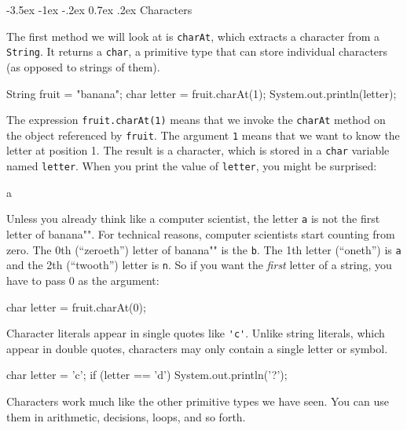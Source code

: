 \documentclass[12pt]{book}
\makeatletter
\theoremstyle{exercise}
\newcommand{\java}[1]{\verb"#1"}
\renewcommand{\section}{\@startsection {section}{1}{\z@}%
    {-3.5ex \@plus -1ex \@minus -.2ex}%
    {0.7ex \@plus.2ex}%
    {\normalfont\Large\bfseries}}
\newcommand{\java}[1]{\lstinline{#1}} %
\makeatother
\begin{document}
\section{Characters}


The first method we will look at is \java{charAt}, which extracts a character from a \java{String}.
It returns a \java{char}, a primitive type that can store individual characters (as opposed to strings of them).

\begin{code}
    String fruit = "banana";
    char letter = fruit.charAt(1);
    System.out.println(letter);
\end{code}

The expression \java{fruit.charAt(1)} means that we invoke the \java{charAt} method on the object referenced by \java{fruit}.
The argument \java{1} means that we want to know the letter at position 1.
The result is a character, which is stored in a \java{char} variable named \java{letter}.
When you print the value of \java{letter}, you might be surprised:

\begin{stdout}
a
\end{stdout}

Unless you already think like a computer scientist, the letter \java{a} is not the first letter of \java{"banana"}.
For technical reasons, computer scientists start counting from zero.
The 0th (``zeroeth'') letter of \java{"banana"} is the \java{b}.
The 1th letter (``oneth'') is \java{a} and the 2th (``twooth'') letter is \java{n}.
So if you want the {\em first} letter of a string, you have to pass 0 as the argument:

\begin{code}
    char letter = fruit.charAt(0);
\end{code}


Character literals appear in single quotes like \java{'c'}.
Unlike string literals, which appear in double quotes, characters may only contain a single letter or symbol.

\begin{code}
    char letter = 'c';
    if (letter == 'd') {
        System.out.println('?');
    }
\end{code}

Characters work much like the other primitive types we have seen.
You can use them in arithmetic, decisions, loops, and so forth.
\end{document}
